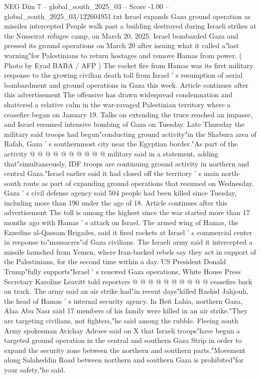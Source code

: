 \begin{textsample}{NEG Dim 7 – global\_south\_2025\_03 – Score -1.00 – global\_south\_2025\_03/122604951.txt}  \label{ex:f7_neg_029}
Israel expands Gaza ground operation as missiles intercepted People walk past a building destroyed during Israeli strikes at the Nusseirat refugee camp, on March 20, 2025.
Israel bombarded Gaza and pressed its ground operations on March 20 after issuing what it called a"last warning"for Palestinians to return hostages and remove Hamas from power. ( Photo by Eyad BABA / AFP ) The rocket fire from Hamas was its first military response to the growing civilian death toll from Israel ' s resumption of aerial bombardment and ground operations in Gaza this week.
Article continues after this advertisement The offensive has drawn widespread condemnation and shattered a relative calm in the war-ravaged Palestinian territory where a ceasefire began on January 19.
Talks on extending the truce reached an impasse, and Israel resumed intensive bombing of Gaza on Tuesday.
Late Thursday the military said troops had begun"conducting ground activity"in the Shabura area of Rafah, Gaza ' s southernmost city near the Egyptian border."As part of the activity @ @ @ @ @ @ @ @ @ @ military said in a statement, adding that"simultaneously, IDF troops are continuing ground activity in northern and central Gaza."Israel earlier said it had closed off the territory ' s main north-south route as part of expanding ground operations that resumed on Wednesday.
Gaza ' s civil defense agency said 504 people had been killed since Tuesday, including more than 190 under the age of 18.
Article continues after this advertisement The toll is among the highest since the war started more than 17 months ago with Hamas ' s attack on Israel.
The armed wing of Hamas, the Ezzedine al-Qassam Brigades, said it fired rockets at Israel ' s commercial center in response to"massacres"of Gaza civilians.
The Israeli army said it intercepted a missile launched from Yemen, where Iran-backed rebels say they act in support of the Palestinians, for the second time within a day.
US President Donald Trump"fully supports"Israel ' s renewed Gaza operations, White House Press Secretary Karoline Leavitt told reporters @ @ @ @ @ @ @ @ @ @ ceasefire back on track.
The army said an air strike had"in recent days"killed Rashid Jahjouh, the head of Hamas ' s internal security agency.
In Beit Lahia, northern Gaza, Alaa Abu Nasr said 17 members of his family were killed in an air strike."They are targeting civilians, not fighters,"he said among the rubble.
Fleeing south Army spokesman Avichay Adraee said on X that Israeli troops"have begun a targeted ground operation in the central and southern Gaza Strip in order to expand the security zone between the northern and southern parts."Movement along Salaheddin Road between northern and southern Gaza is prohibited"for your safety,"he said.

\end{textsample}
